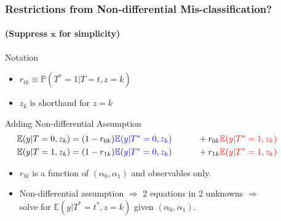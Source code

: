 \documentclass{beamer}
\begin{document}
\begin{frame}[t,noframenumbering]
  \frametitle{Restrictions from Non-differential Mis-classification?}
  \framesubtitle{(Suppress $\mathbf{x}$ for simplicity)}

  \footnotesize

  \begin{block}{Notation}
    \begin{itemize}
      \item $r_{tk} \equiv \mathbb{P}(T^*=1|T=t,z=k)$ 
      \item $z_k$ is shorthand for $z =k$\\
    \end{itemize}
  \end{block}
  
  \begin{block}{Adding Non-differential Assumption}
    \vspace{-1em}
  \begin{align*}
    \mathbb{E}(y|T=0,z_k) &= (1 - r_{0k})\textcolor{blue}{\mathbb{E}(y|T^*=0,z_k)}\phantom{,T=0} + r_{0k}\textcolor{red}{\mathbb{E}(y|T^*=1,z_k)}\phantom{,T=0}\\
    \mathbb{E}(y|T=1,z_k) &= (1 - r_{1k}) \textcolor{blue}{\mathbb{E}(y|T^*=0,z_k)}\phantom{,T=1} + r_{1k}\textcolor{red}{\mathbb{E}(y|T^*=1,z_k)}\phantom{,T=1}
  \end{align*}
  \end{block}


  \begin{itemize}
    \item $r_{tk}$ is a function of $(\alpha_0, \alpha_1)$ and observables only.
    \item \alert{Non-differential assumption $\Rightarrow$ 2 equations in 2 unknowns $\Rightarrow$\\ solve for $\mathbb{E}(y|T^*=t^*,z=k)$ given $(\alpha_0, \alpha_1)$.}
  \end{itemize}

\end{frame}
\end{document}

